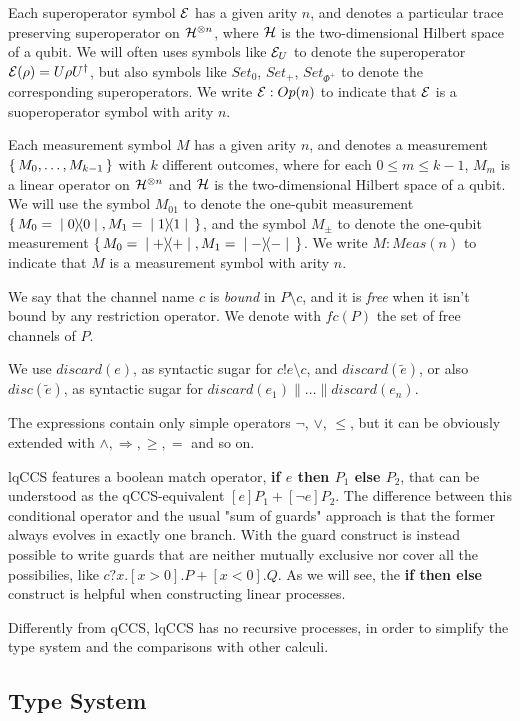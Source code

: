 Each superoperator symbol $\mathcal{E}$ has a given arity $n$, and denotes a particular trace preserving superoperator on $\mathcal{H}^{\otimes n}$, where $\mathcal{H}$ is the two-dimensional Hilbert space of a qubit. We will often uses symbols like $\mathcal{E}_U$ to denote the superoperator $\mathcal{E}(\rho) = U \rho U^\dagger$, but also symbols like $Set_0$, $Set_+$, 
$Set_{\Phi^+}$ to denote the corresponding superoperators. We write $\mathcal{E}: Op(n)$ to indicate  that $\mathcal{E}$ is a suoperoperator symbol with arity $n$.

Each measurement symbol $M$ has a given arity $n$, and denotes a measurement $\set{M_0, \ldots, M_{k-1}}$ with $k$ different outcomes, where for each $0 \leq m \leq k-1$, $M_m$ is a linear operator on $\mathcal{H}^{\otimes n}$ and $\mathcal{H}$ is the two-dimensional Hilbert space of a qubit. We will use the symbol $M_{01}$ to denote the one-qubit measurement $\set{M_0 = \ket{0}\!\!\bra{0}, M_1=\ket{1}\!\!\bra{1}}$, and the symbol $M_\pm$ to denote the one-qubit measurement $\set{M_0 = \ket{+}\!\!\bra{+}, M_1 = \ket{-}\!\!\bra{-}}$. We write $M: Meas(n)$ to indicate  that $M$ is a measurement symbol with arity $n$.

We say that the channel name $c$ is \textit{bound} in $P\setminus c$, and it is \textit{free} when it isn't bound by any restriction operator. We denote with $fc(P)$ the set of free channels of $P$.

We use $discard(e)$, as syntactic sugar for $c!e \setminus c$, and $discard(\widetilde{e})$, or also $disc(\widetilde{e})$, as syntactic sugar for $discard(e_1)\parallel \ldots\parallel discard(e_n)$.

The expressions contain only simple operators $\neg$, $\vee$, $\leq$, but it can be obviously extended with $\wedge, \Rightarrow, \geq, =$ and so on.

lqCCS features a boolean match operator, \textbf{if $e$ then $P_1$ else $P_2$}, that can be understood as the qCCS-equivalent $[e]P_1 + [\neg e]P_2$. The difference between this conditional operator and the usual "sum of guards" approach is that the former always evolves in exactly one branch. With the guard construct is instead possible to write guards that are neither mutually exclusive nor cover all the possibilies, like $c?x.[x > 0].P + [x < 0].Q$. As we will see, the  \textbf{if then else} construct is helpful when constructing linear processes.

Differently from qCCS, lqCCS has no recursive processes, in order to simplify the type system and the comparisons with other calculi.


\subsection{Type System}

